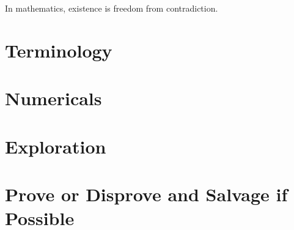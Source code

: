 \documentclass{homework}
\author{Jim Fowler}
\begin{document}
\maketitle

\begin{inspiration}
In mathematics, existence is freedom from contradiction.
\end{inspiration}

\section{Terminology}

\section{Numericals}

\section{Exploration}

\section{Prove or Disprove and Salvage if Possible}
\end{document}
